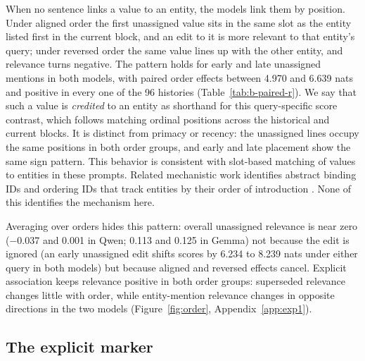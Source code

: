 When no sentence links a value to an entity, the models link them by position. Under aligned order the first unassigned value sits in the same slot as the entity listed first in the current block, and an edit to it is more relevant to that entity's query; under reversed order the same value lines up with the other entity, and relevance turns negative. The pattern holds for early and late unassigned mentions in both models, with paired order effects between 4.970 and 6.639 nats and positive in every one of the 96 histories (Table~\ref{tab:b-paired-r}). We say that such a value is \emph{credited} to an entity as shorthand for this query-specific score contrast, which follows matching ordinal positions across the historical and current blocks. It is distinct from primacy or recency: the unassigned lines occupy the same positions in both order groups, and early and late placement show the same sign pattern. This behavior is consistent with slot-based matching of values to entities in these prompts. Related mechanistic work identifies abstract binding IDs \citep{feng2024bind} and ordering IDs that track entities by their order of introduction \citep{prakash2026lookbacks}. None of this identifies the mechanism here.

Averaging over orders hides this pattern: overall unassigned relevance is near zero (−0.037 and 0.001 in Qwen; 0.113 and 0.125 in Gemma) not because the edit is ignored (an early unassigned edit shifts scores by 6.234 to 8.239 nats under either query in both models) but because aligned and reversed effects cancel. Explicit association keeps relevance positive in both order groups: superseded relevance changes little with order, while entity-mention relevance changes in opposite directions in the two models (Figure~\ref{fig:order}, Appendix~\ref{app:exp1}).

\subsection{The explicit marker}
\label{sec:marker-results}

